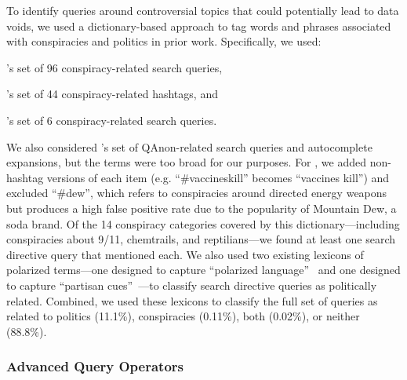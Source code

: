 To identify queries around controversial topics that could potentially lead to data voids, we used a dictionary-based approach to tag words and phrases associated with conspiracies and politics in prior work.
Specifically, we used:
\begin{inparaenum}[(1)] %
    \item \textcite{ballatore2015google}'s set of 96 conspiracy-related search queries,
    \item \textcite{mahl2021nasa}'s set of 44 conspiracy-related hashtags, and
    \item \textcite{urman2022where}'s set of 6 conspiracy-related search queries.
\end{inparaenum}
We also considered \textcite{haak2023qbias}'s set of QAnon-related search queries and autocomplete expansions, but the terms were too broad for our purposes.
For \textcite{mahl2021nasa}, we added non-hashtag versions of each item (e.g. ``\#vaccineskill'' becomes ``vaccines kill'') and excluded ``\#dew'', which refers to conspiracies around directed energy weapons but produces a high false positive rate due to the popularity of Mountain Dew, a soda brand.
Of the 14 conspiracy categories covered by this dictionary---including conspiracies about 9/11, chemtrails, and reptilians---we found at least one search directive query that mentioned each.
We also used two existing lexicons of polarized terms---one designed to capture ``polarized language''~\citep{simchon2022troll} and one designed to capture ``partisan cues''~\citep{hu2019auditing}---to classify search directive queries as politically related.
Combined, we used these lexicons to classify the full set of queries as related to politics (11.1\%), conspiracies (0.11\%), both (0.02\%), or neither (88.8\%).

\subsubsection{Advanced Query Operators} 
\label{sec:methods-queries-operators}

